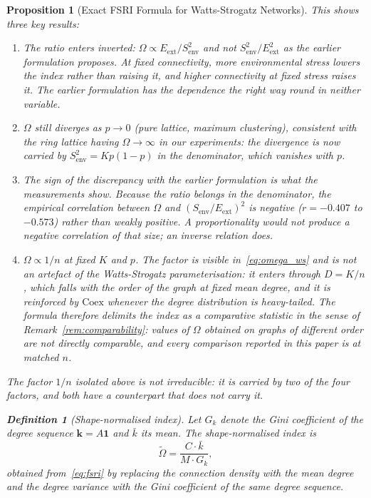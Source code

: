 \documentclass[11pt,a4paper]{article}
\newtheorem{proposition}{Proposition}
\newtheorem{definition}{Definition}
\begin{document}
\begin{proposition}[Exact FSRI Formula for Watts-Strogatz Networks]
This shows three key results:
\begin{enumerate}
\item The ratio enters \emph{inverted}: $\Omega \propto E_\mathrm{ext} /
  S_\mathrm{env}^2$ and not $S_\mathrm{env}^2/E_\mathrm{ext}^2$ as the earlier
  formulation proposes. At fixed connectivity, more environmental stress
  \emph{lowers} the index rather than raising it, and higher connectivity at
  fixed stress raises it. The earlier formulation has the dependence the right
  way round in neither variable.
\item $\Omega$ still diverges as $p \to 0$ (pure lattice, maximum clustering),
  consistent with the ring lattice having $\Omega \to \infty$ in our
  experiments: the divergence is now carried by $S_\mathrm{env}^2 = Kp(1-p)$
  in the denominator, which vanishes with $p$.
\item The sign of the discrepancy with the earlier formulation is what the
  measurements show. Because the ratio belongs in the denominator, the
  empirical correlation between $\Omega$ and $(S_\mathrm{env}/E_\mathrm{ext})^2$
  is \emph{negative} ($r = -0.407$ to $-0.573$) rather than weakly positive.
  A proportionality would not produce a negative correlation of that size;
  an inverse relation does.
\item $\Omega \propto 1/n$ at fixed $K$ and $p$. The factor is visible
  in~\eqref{eq:omega_ws} and is not an artefact of the Watts-Strogatz
  parameterisation: it enters through $D = K/n$, which falls with the order
  of the graph at fixed mean degree, and it is reinforced by
  $\mathrm{Coex}$ whenever the degree distribution is heavy-tailed. The
  formula therefore delimits the index as a \emph{comparative} statistic in
  the sense of Remark~\ref{rem:comparability}: values of $\Omega$ obtained
  on graphs of different order are not directly comparable, and every
  comparison reported in this paper is at matched $n$.
\end{enumerate}

The factor $1/n$ isolated above is not irreducible: it is carried by two of
the four factors, and both have a counterpart that does not carry it.

\begin{definition}[Shape-normalised index]
\label{def:shape}
Let $G_k$ denote the Gini coefficient of the degree sequence
$\mathbf{k} = A\mathbf{1}$ and $\bar{k}$ its mean. The shape-normalised
index is
\begin{equation}
\widetilde{\Omega} = \frac{C \cdot \bar{k}}{M \cdot G_k},
\label{eq:omega_tilde}
\end{equation}
obtained from~\eqref{eq:fsri} by replacing the connection density with the
mean degree and the degree variance with the Gini coefficient of the same
degree sequence.
\end{definition}


\end{proposition}
\end{document}
